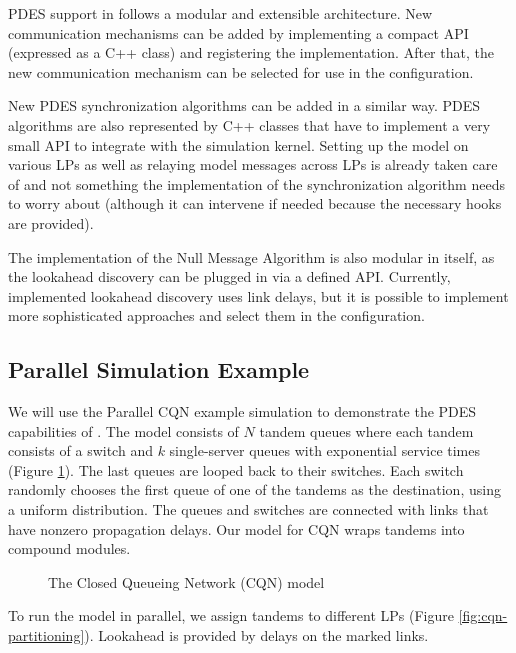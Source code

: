 PDES support in {\opp} follows a modular and extensible architecture.
New communication mechanisms can be added by implementing a compact
API (expressed as a C++ class) and registering the implementation.
After that, the new communication mechanism can be selected for use
in the configuration.

New PDES synchronization algorithms can be added in a similar way.
PDES algorithms are also represented by C++ classes that have
to implement a very small API to integrate with the simulation kernel.
Setting up the model on various LPs as well as relaying
model messages across LPs is already taken care of and
not something the implementation of the synchronization algorithm
needs to worry about (although it can intervene if needed
because the necessary hooks are provided).

The implementation of the Null Message Algorithm is also
modular in itself, as the lookahead discovery can be plugged
in via a defined API. Currently, implemented lookahead
discovery uses link delays, but it is possible to
implement more sophisticated approaches and select them in the
configuration.



\subsection{Parallel Simulation Example}
\label{sec:parallel-exec:parallel-simulation-example}

We will use the Parallel CQN example simulation to demonstrate the
PDES capabilities of {\opp}.
The model consists of $N$ tandem queues where each tandem consists
of a switch and $k$ single-server queues with exponential service times
(Figure \ref{fig:cqn-model}).
The last queues are looped back to their switches. Each switch
randomly chooses the first queue of one of the tandems as the destination,
using a uniform distribution. The queues and switches are connected
with links that have nonzero propagation delays.
Our {\opp} model for CQN wraps tandems into compound modules.


\begin{figure}[htbp]
  \begin{center}
    
    \caption{The Closed Queueing Network (CQN) model}
    \label{fig:cqn-model}
  \end{center}
\end{figure}

To run the model in parallel, we assign tandems to different LPs
(Figure \ref{fig:cqn-partitioning}). Lookahead is provided
by delays on the marked links.

